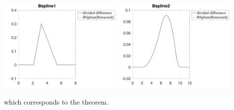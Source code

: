 \documentclass{article}
\begin{document}
\includegraphics[width=0.45\textwidth]{figures/Assignment_G_1_Compare.png}
\includegraphics[width=0.45\textwidth]{figures/Assignment_G_2_Compare.png}

which corresponds to the theorem.
\end{document}
